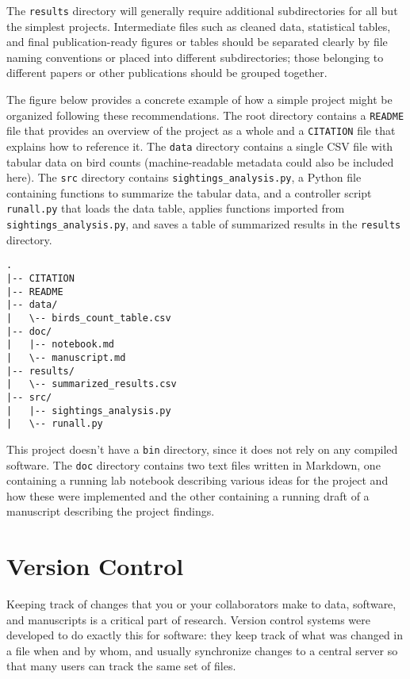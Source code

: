 \documentclass[10pt]{article}
\begin{document}
The \texttt{results} directory will generally require additional
subdirectories for all but the simplest projects. Intermediate files
such as cleaned data, statistical tables, and final publication-ready
figures or tables should be separated clearly by file naming conventions
or placed into different subdirectories; those belonging to different
papers or other publications should be grouped together.

The figure below provides a concrete example of how a simple project
might be organized following these recommendations. The root directory
contains a \texttt{README} file that provides an overview of the
project as a whole and a \texttt{CITATION} file that explains how to
reference it. The \texttt{data} directory contains a single CSV file
with tabular data on bird counts (machine-readable metadata could also
be included here). The \texttt{src} directory contains
\texttt{sightings\_analysis.py}, a Python file containing functions to
summarize the tabular data, and a controller script \texttt{runall.py}
that loads the data table, applies functions imported from
\texttt{sightings\_analysis.py}, and saves a table of summarized
results in the \texttt{results} directory.

\begin{verbatim}
.
|-- CITATION
|-- README
|-- data/
|   \-- birds_count_table.csv
|-- doc/
|   |-- notebook.md
|   \-- manuscript.md
|-- results/
|   \-- summarized_results.csv
|-- src/
|   |-- sightings_analysis.py
|   \-- runall.py
\end{verbatim}

This project doesn't have a \texttt{bin} directory, since it does not
rely on any compiled software. The \texttt{doc} directory contains two
text files written in Markdown, one containing a running lab notebook
describing various ideas for the project and how these were implemented
and the other containing a running draft of a manuscript describing the
project findings.

\section{Version Control}\label{sec:versioning}

Keeping track of changes that you or your collaborators make to data,
software, and manuscripts is a critical part of research. Version
control systems were developed to do exactly this for software: they
keep track of what was changed in a file when and by whom, and usually
synchronize changes to a central server so that many users can track the
same set of files.
\end{document}
